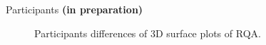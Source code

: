 \subsection{}
{

\begin{frame}{Participants
	{\bf (in preparation)}
}
    \begin{figure}
	\caption{Participants differences of 3D surface plots of RQA.} 
   \end{figure}
	
\end{frame}
}

%
%
%
%	
%

